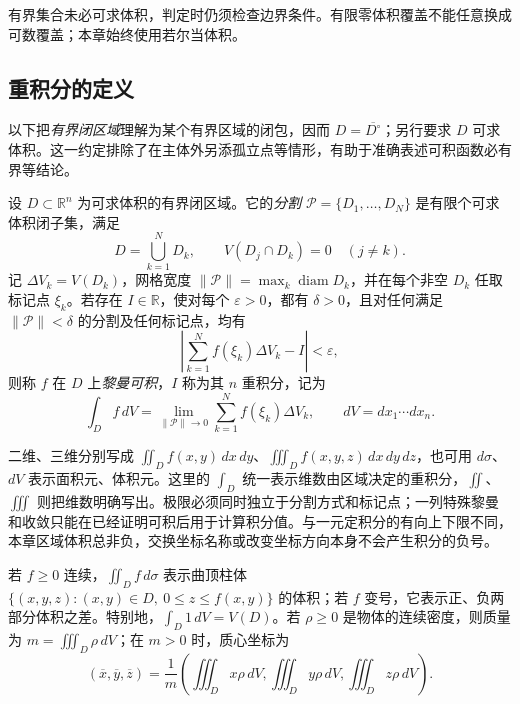 \documentclass[UTF8,12pt,a4paper,fontset=fandol]{ctexbook}
\begin{document}
\begin{notealert}[type=caution,title={有界与可求体积是不同条件}]
有界集合未必可求体积，判定时仍须检查边界条件。有限零体积覆盖不能任意换成可数覆盖；本章始终使用若尔当体积。
\end{notealert}

\subsection{重积分的定义}
\label{subsec:definition-of-multiple-integrals}

以下把\emph{有界闭区域}理解为某个有界区域的闭包，因而 $D=\overline{D^\circ}$；另行要求 $D$ 可求体积。这一约定排除了在主体外另添孤立点等情形，有助于准确表述可积函数必有界等结论。

\begin{definition}
\label{def:multiple-riemann-integral}
设 $D\subset\mathbb R^n$ 为可求体积的有界闭区域。它的\emph{分割} $\mathcal P=\{D_1,\ldots,D_N\}$ 是有限个可求体积闭子集，满足
\[
    D=\bigcup_{k=1}^ND_k,\qquad V(D_j\cap D_k)=0\quad(j\ne k).
\]
记 $\Delta V_k=V(D_k)$，网格宽度 $\|\mathcal P\|=\max_k\operatorname{diam}D_k$，并在每个非空 $D_k$ 任取标记点 $\xi_k$。若存在 $I\in\mathbb R$，使对每个 $\varepsilon>0$，都有 $\delta>0$，且对任何满足 $\|\mathcal P\|<\delta$ 的分割及任何标记点，均有
\[
    \left|\sum_{k=1}^Nf(\xi_k)\Delta V_k-I\right|<\varepsilon,
\]
则称 $f$ 在 $D$ 上\emph{黎曼可积}，$I$ 称为其 $n$ 重积分，记为
\begin{equation}
    \int_D f\,dV=\lim_{\|\mathcal P\|\to0}
    \sum_{k=1}^Nf(\xi_k)\Delta V_k,
    \qquad dV=dx_1\cdots dx_n.
    \label{eq:multiple-riemann-definition}
\end{equation}
\end{definition}

二维、三维分别写成 $\iint_D f(x,y)\,dx\,dy$、$\iiint_D f(x,y,z)\,dx\,dy\,dz$，也可用 $d\sigma$、$dV$ 表示面积元、体积元。这里的 $\int_D$ 统一表示维数由区域决定的重积分，$\iint$、$\iiint$ 则把维数明确写出。极限必须同时独立于分割方式和标记点；一列特殊黎曼和收敛只能在已经证明可积后用于计算积分值。与一元定积分的有向上下限不同，本章区域体积总非负，交换坐标名称或改变坐标方向本身不会产生积分的负号。

若 $f\geq0$ 连续，$\iint_D f\,d\sigma$ 表示曲顶柱体 $\{(x,y,z):(x,y)\in D,\ 0\leq z\leq f(x,y)\}$ 的体积；若 $f$ 变号，它表示正、负两部分体积之差。特别地，$\int_D1\,dV=V(D)$。若 $\rho\geq0$ 是物体的连续密度，则质量为 $m=\iiint_D\rho\,dV$；在 $m>0$ 时，质心坐标为
\begin{equation}
    (\overline x,\overline y,\overline z)
    =\frac1m\left(\iiint_Dx\rho\,dV,
    \iiint_Dy\rho\,dV,\iiint_Dz\rho\,dV\right).
    \label{eq:multiple-mass-centroid}
\end{equation}
\end{document}
